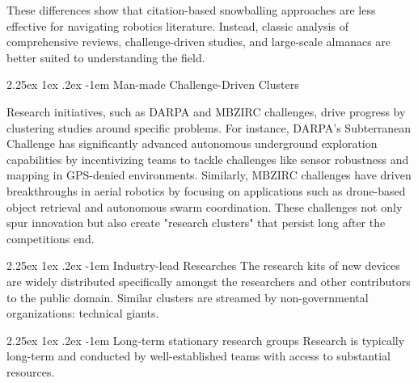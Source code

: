 \documentclass[runningheads]{llncs}
\makeatletter
\renewcommand\paragraph{\@startsection{paragraph}{4}{\z@}%
                                    {2.25ex \@plus1ex \@minus.2ex}%
                                    {-1em}%
                                    {\normalfont\normalsize\bfseries}}
\makeatother
\begin{document}
These differences show that citation-based snowballing approaches are less effective for navigating robotics literature. Instead, classic analysis of comprehensive reviews, challenge-driven studies, and large-scale almanacs are better suited to understanding the field.

\paragraph{Man-made Challenge-Driven Clusters}



Research initiatives, such as DARPA and MBZIRC challenges, drive progress by clustering studies around specific problems. For instance, DARPA's Subterranean Challenge has significantly advanced autonomous underground exploration capabilities by incentivizing teams to tackle challenges like sensor robustness and mapping in GPS-denied environments. Similarly, MBZIRC challenges have driven breakthroughs in aerial robotics by focusing on applications such as drone-based object retrieval and autonomous swarm coordination. These challenges not only spur innovation but also create "research clusters" that persist long after the competitions end.


\paragraph{Industry-lead Researches}
The research kits of new devices are widely distributed specifically amongst the researchers and other contributors to the public domain. Similar clusters are streamed by non-governmental organizations: technical giants.

\paragraph{Long-term stationary research groups}
Research is typically long-term and conducted by well-established teams with access to substantial resources.

\end{document}
